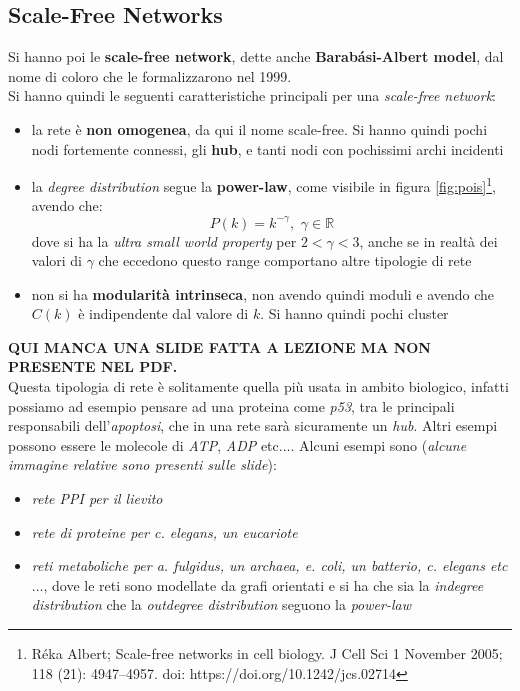 \documentclass[a4paper,12pt, oneside]{book}
\begin{document}
\subsection{Scale-Free Networks}
Si hanno poi le \textbf{scale-free network}, dette anche \textbf{Barabási-Albert
  model}, dal nome di coloro che le formalizzarono nel 1999.\\
Si hanno quindi le seguenti caratteristiche principali per una
\textit{scale-free network}:
\begin{itemize}
  \item la rete è \textbf{non omogenea}, da qui il nome scale-free. Si hanno
  quindi pochi nodi fortemente connessi, gli \textbf{hub}, e tanti nodi con
  pochissimi archi incidenti
  \item la \textit{degree distribution} segue la \textbf{power-law}, come
  visibile in figura \ref{fig:pois}\footnote{Réka Albert; Scale-free 
    networks in cell biology. J Cell Sci 1 November 2005; 118 (21):
    4947–4957. doi: https://doi.org/10.1242/jcs.02714}, avendo che: 
  \[P(k)=k^{-\gamma},\,\,\gamma\in\mathbb{R}\]
  dove si ha la \textit{ultra small world property} per $2<\gamma<3$, anche se
  in realtà dei valori di $\gamma$ che eccedono questo range comportano altre
  tipologie di rete
  \item non si ha \textbf{modularità intrinseca}, non avendo quindi moduli e
  avendo che$ C(k)$ è indipendente dal valore di $k$. Si hanno quindi pochi
  cluster 
\end{itemize}
\textbf{QUI MANCA UNA SLIDE FATTA A LEZIONE MA NON PRESENTE NEL PDF.}\\
Questa tipologia di rete è solitamente quella più usata in ambito
biologico, infatti possiamo ad esempio pensare ad una proteina come
\textit{p53}, tra le principali responsabili dell'\textit{apoptosi}, che in una
rete sarà sicuramente un \textit{hub}. Altri esempi possono essere le molecole
di \textit{ATP}, \textit{ADP} etc$\ldots$. Alcuni esempi sono (\textit{alcune
  immagine relative sono presenti sulle slide}): 
\begin{itemize}
  \item \textit{rete PPI per il lievito}
  \item \textit{rete di proteine per c. elegans, un eucariote}
  \item \textit{reti metaboliche per a. fulgidus, un archaea, e. coli, un
    batterio, c. elegans etc$\ldots$}, dove le reti sono modellate da grafi
  orientati e si ha che sia la \textit{indegree distribution} che la
  \textit{outdegree distribution} seguono la \textit{power-law}
\end{itemize}
\end{document}
